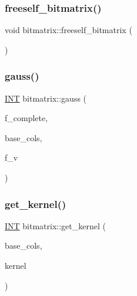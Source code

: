 \subsubsection{\texorpdfstring{freeself\+\_\+bitmatrix()}{freeself\_bitmatrix()}}
{\footnotesize\ttfamily void bitmatrix\+::freeself\+\_\+bitmatrix (\begin{DoxyParamCaption}{ }\end{DoxyParamCaption})}

\mbox{\label{classbitmatrix_ad43da9e457904e1dfa459b78147e0667}} 
\subsubsection{\texorpdfstring{gauss()}{gauss()}}
{\footnotesize\ttfamily \mbox{\hyperlink{galois_8h_a09fddde158a3a20bd2dcadb609de11dc}{I\+NT}} bitmatrix\+::gauss (\begin{DoxyParamCaption}\item[{\mbox{\hyperlink{galois_8h_a09fddde158a3a20bd2dcadb609de11dc}{I\+NT}}}]{f\+\_\+complete,  }\item[{\mbox{\hyperlink{class_vector}{Vector}} \&}]{base\+\_\+cols,  }\item[{\mbox{\hyperlink{galois_8h_a09fddde158a3a20bd2dcadb609de11dc}{I\+NT}}}]{f\+\_\+v }\end{DoxyParamCaption})}

\mbox{\label{classbitmatrix_a665129645bad35018674f8b5a694a13e}} 
\subsubsection{\texorpdfstring{get\+\_\+kernel()}{get\_kernel()}}
{\footnotesize\ttfamily \mbox{\hyperlink{galois_8h_a09fddde158a3a20bd2dcadb609de11dc}{I\+NT}} bitmatrix\+::get\+\_\+kernel (\begin{DoxyParamCaption}\item[{\mbox{\hyperlink{class_vector}{Vector}} \&}]{base\+\_\+cols,  }\item[{\mbox{\hyperlink{classbitmatrix}{bitmatrix}} \&}]{kernel }\end{DoxyParamCaption})}

\mbox{\label{classbitmatrix_afaf5dd4ed44805c659d2fd5a6fc89ec4}} 
